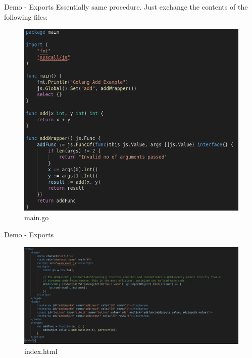 \documentclass{beamer}
\begin{document}
\begin{frame}{Demo - Exports}
    Essentially same procedure. Just exchange the contents of the following files:
    \begin{figure}
        \includegraphics[scale=0.2]{./images/main.png}
        \caption{main.go}
    \end{figure}

\end{frame}

\begin{frame}{Demo - Exports}
    \begin{figure}
        \includegraphics[scale=0.2]{./images/index.png}
        \caption{index.html}
    \end{figure}

\end{frame}
\end{document}

